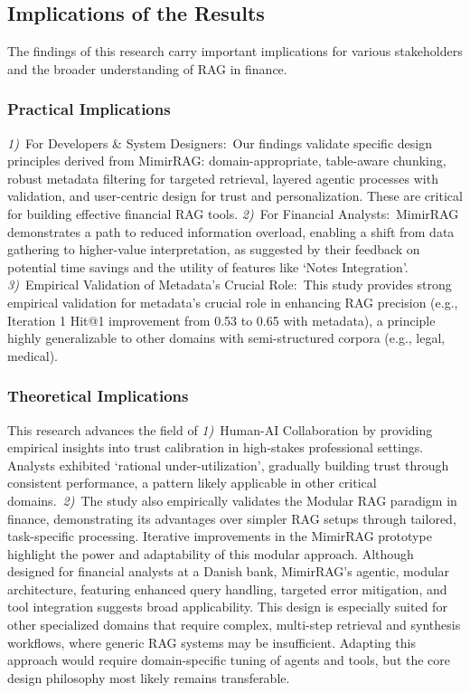 \documentclass[final,5p,times,twopage,twocolumn,a4paper]{elsarticle}
\begin{document}
\subsection{Implications of the Results}
The findings of this research carry important implications for various stakeholders and the broader understanding of RAG in finance.

\subsubsection{Practical Implications}
\textit{1)}~For Developers \& System Designers:~Our findings validate specific design principles derived from MimirRAG: domain-appropriate, table-aware chunking, robust metadata filtering for targeted retrieval, layered agentic processes with validation, and user-centric design for trust and personalization. These are critical for building effective financial RAG tools. \textit{2)}~For Financial Analysts:~MimirRAG demonstrates a path to reduced information overload, enabling a shift from data gathering to higher-value interpretation, as suggested by their feedback on potential time savings and the utility of features like `Notes Integration'. \textit{3)}~Empirical Validation of Metadata's Crucial Role:~This study provides strong empirical validation for metadata's crucial role in enhancing RAG precision (e.g., Iteration 1 Hit@1 improvement from 0.53 to 0.65 with metadata), a principle highly generalizable to other domains with semi-structured corpora (e.g., legal, medical).


\subsubsection{Theoretical Implications}
This research advances the field of \textit{1)}~Human-AI Collaboration by providing empirical insights into trust calibration in high-stakes professional settings. Analysts exhibited `rational under-utilization', gradually building trust through consistent performance, a pattern likely applicable in other critical domains.~\textit{2)}~The study also empirically validates the Modular RAG paradigm in finance, demonstrating its advantages over simpler RAG setups through tailored, task-specific processing. Iterative improvements in the MimirRAG prototype highlight the power and adaptability of this modular approach. Although designed for financial analysts at a Danish bank, MimirRAG's agentic, modular architecture, featuring enhanced query handling, targeted error mitigation, and tool integration suggests broad applicability. This design is especially suited for other specialized domains that require complex, multi-step retrieval and synthesis workflows, where generic RAG systems may be insufficient. Adapting this approach would require domain-specific tuning of agents and tools, but the core design philosophy most likely remains transferable.
\end{document}
